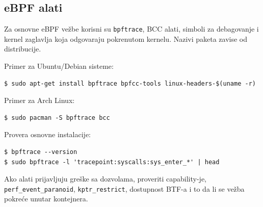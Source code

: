 \subsection{eBPF alati}\label{instalacija-ebpf}

Za osnovne eBPF vežbe korisni su \texttt{bpftrace}, BCC alati, simboli za debagovanje i kernel zaglavlja koja odgovaraju pokrenutom kernelu. Nazivi paketa zavise od distribucije.

Primer za Ubuntu/Debian sisteme:

\begin{verbatim}
$ sudo apt-get install bpftrace bpfcc-tools linux-headers-$(uname -r)
\end{verbatim}

Primer za Arch Linux:

\begin{verbatim}
$ sudo pacman -S bpftrace bcc
\end{verbatim}

Provera osnovne instalacije:

\begin{verbatim}
$ bpftrace --version
$ sudo bpftrace -l 'tracepoint:syscalls:sys_enter_*' | head
\end{verbatim}

Ako alati prijavljuju greške sa dozvolama, proveriti capability-je, \texttt{perf\_event\_paranoid}, \texttt{kptr\_restrict}, dostupnost BTF-a i to da li se vežba pokreće unutar kontejnera.
